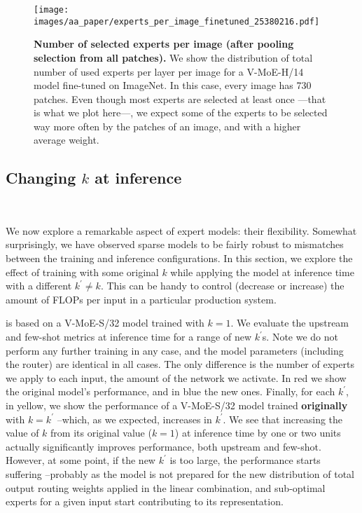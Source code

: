 \documentclass{article}
\newcommand{\abbv}{{V-MoE}}
\begin{document}
\begin{figure}[h]
\centering
\texttt{[image: images/aa\_paper/experts\_per\_image\_finetuned\_25380216.pdf]}
\caption{
\textbf{Number of selected experts per image (after pooling selection from all patches).}
We show the distribution of total number of used experts per layer per image for a \abbv{}-H/14 model fine-tuned on ImageNet.
In this case, every image has 730 patches.
Even though most experts are selected at least once ---that is what we plot here---, we expect some of the experts to be selected way more often by the patches of an image, and with a higher average weight.
}
\label{im:experts_per_image}
\end{figure}

\clearpage

\subsection{Changing \texorpdfstring{$k$}{k} at inference}\
\label{app_analysis_routing_changing_k}

We now explore a remarkable aspect of expert models: their flexibility.
Somewhat surprisingly, we have observed sparse models to be fairly robust to mismatches between the training and inference configurations.
In this section, we explore the effect of training with some original $k$ while applying the model at inference time with a different $k^\prime \neq k$.
This can be handy to control (decrease or increase) the amount of FLOPs per input in a particular production system.

 is based on a \abbv{}-S/32 model trained with $k=1$.
We evaluate the upstream and few-shot metrics at inference time for a range of new $k^\prime$s.
Note we do not perform any further training in any case, and the model parameters (including the router) are identical in all cases.
The only difference is the number of experts we apply to each input, the amount of the network we activate.
In red we show the original model's performance, and in blue the new ones.
Finally, for each $k^\prime$, in yellow, we show the performance of a \abbv{}-S/32 model trained \textbf{originally} with $k = k^\prime$ --which, as we expected, increases in $k^\prime$.
We see that increasing the value of $k$ from its original value ($k=1$) at inference time by one or two units actually significantly improves performance, both upstream and few-shot.
However, at some point, if the new $k^\prime$ is too large, the performance starts suffering --probably as the model is not prepared for the new distribution of total output routing weights applied in the linear combination, and sub-optimal experts for a given input start contributing to its representation.
\end{document}
